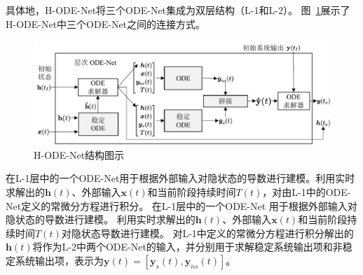 具体地，H-ODE-Net将三个ODE-Net集成为双层结构（L-1和L-2）。
图~\ref{fig:H_ode}展示了H-ODE-Net中三个ODE-Net之间的连接方式。
\begin{figure}
    \centering
    \includegraphics[width=\linewidth]{figures/chapter4/Hode.pdf}
    \caption{H-ODE-Net结构图示}
    \label{fig:H_ode}
\end{figure}
在L-1层中的一个ODE-Net用于根据外部输入对隐状态的导数进行建模。利用实时求解出的$\boldsymbol h(t)$、外部输入$\boldsymbol x(t)$和当前阶段持续时间$T(t)$，对由L-1中的ODE-Net定义的常微分方程进行积分。
在L-1层中的一个ODE-Net
用于根据外部输入对隐状态的导数进行建模。
利用实时求解出的$\boldsymbol h(t)$、外部输入$\boldsymbol x(t)$和当前阶段持续时间$T(t)$对隐状态导数进行建模。
对L-1中定义的常微分方程进行积分解出的$\boldsymbol h(t)$将作为L-2中两个ODE-Net的输入，并分别用于求解稳定系统输出项和非稳定系统输出项，表示为$\boldsymbol y(t)=[\boldsymbol y_s(t), \boldsymbol y_{ns}(t)]$。

